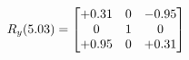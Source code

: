 \documentclass[preview]{standalone}
\begin{document}
\begin{align*}
\special{dvisvgm:raw <g id='unique000'>}R_{y}(5.03) = \begin{bmatrix}+0.31 & 0 & -0.95 \\0 & 1 & 0 \\+0.95 & 0 & +0.31\end{bmatrix}\special{dvisvgm:raw </g>}
\end{align*}
\end{document}
